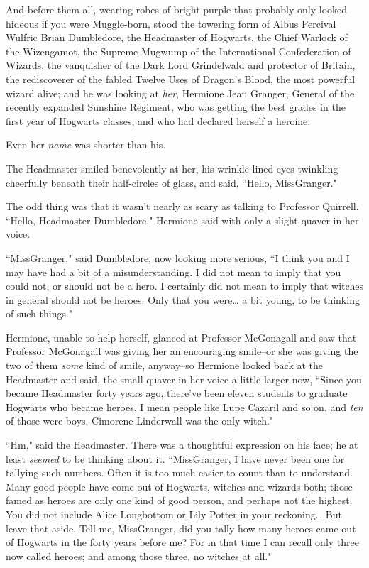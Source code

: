 And before them all, wearing robes of bright purple that probably only looked hideous if you were Muggle-born, stood the towering form of Albus Percival Wulfric Brian Dumbledore, the Headmaster of Hogwarts, the Chief Warlock of the Wizengamot, the Supreme Mugwump of the International Confederation of Wizards, the vanquisher of the Dark Lord Grindelwald and protector of Britain, the rediscoverer of the fabled Twelve Uses of Dragon's Blood, the most powerful wizard alive; and he was looking at \emph{her}, Hermione Jean Granger, General of the recently expanded Sunshine Regiment, who was getting the best grades in the first year of Hogwarts classes, and who had declared herself a heroine.

Even her \emph{name} was shorter than his.

The Headmaster smiled benevolently at her, his wrinkle-lined eyes twinkling cheerfully beneath their half-circles of glass, and said, ``Hello, Miss\?Granger."

The odd thing was that it wasn't nearly as scary as talking to Professor Quirrell. ``Hello, Headmaster Dumbledore," Hermione said with only a slight quaver in her voice.

``Miss\?Granger," said Dumbledore, now looking more serious, ``I think you and I may have had a bit of a misunderstanding. I did not mean to imply that you could not, or should not be a hero. I certainly did not mean to imply that witches in general should not be heroes. Only that you were{\ldots} a bit young, to be thinking of such things."

Hermione, unable to help herself, glanced at Professor McGonagall and saw that Professor McGonagall was giving her an encouraging smile\---or she was giving the two of them \emph{some} kind of smile, anyway\---so Hermione looked back at the Headmaster and said, the small quaver in her voice a little larger now, ``Since you became Headmaster forty years ago, there've been eleven students to graduate Hogwarts who became heroes, I mean people like Lupe Cazaril and so on, and \emph{ten} of those were boys. Cimorene Linderwall was the only witch."

``Hm," said the Headmaster. There was a thoughtful expression on his face; he at least \emph{seemed} to be thinking about it. ``Miss\?Granger, I have never been one for tallying such numbers. Often it is too much easier to count than to understand. Many good people have come out of Hogwarts, witches and wizards both; those famed as heroes are only one kind of good person, and perhaps not the highest. You did not include Alice Longbottom or Lily Potter in your reckoning{\ldots} But leave that aside. Tell me, Miss\?Granger, did you tally how many heroes came out of Hogwarts in the forty years before me? For in that time I can recall only three now called heroes; and among those three, no witches at all."

